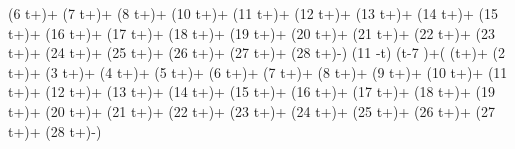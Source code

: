    \left(6 t+\right)+ \sin \left(7 t+\right)+
   \sin \left(8 t+\right)+ \sin \left(10
   t+\right)+ \sin \left(11 t+\right)+ \sin
   \left(12 t+\right)+ \sin \left(13 t+\right)+
   \sin \left(14 t+\right)+ \sin \left(15
   t+\right)+ \sin \left(16 t+\right)+ \sin
   \left(17 t+\right)+ \sin \left(18 t+\right)+
   \sin \left(19 t+\right)+ \sin \left(20
   t+\right)+ \sin \left(21 t+\right)+ \sin
   \left(22 t+\right)+ \sin \left(23 t+\right)+
   \sin \left(24 t+\right)+ \sin \left(25
   t+\right)+ \sin \left(26 t+\right)+ \sin
   \left(27 t+\right)+ \sin \left(28
   t+\right)-\right) \theta (11 \pi -t) \theta (t-7 \pi
   )+\left( \sin \left(t+\right)+ \sin \left(2
   t+\right)+ \sin \left(3 t+\right)+ \sin
   \left(4 t+\right)+ \sin \left(5 t+\right)+ \sin
   \left(6 t+\right)+ \sin \left(7 t+\right)+
   \sin \left(8 t+\right)+ \sin \left(9
   t+\right)+ \sin \left(10 t+\right)+ \sin
   \left(11 t+\right)+ \sin \left(12
   t+\right)+ \sin \left(13 t+\right)+ \sin
   \left(14 t+\right)+ \sin \left(15 t+\right)+
   \sin \left(16 t+\right)+ \sin \left(17
   t+\right)+ \sin \left(18 t+\right)+ \sin
   \left(19 t+\right)+ \sin \left(20 t+\right)+
   \sin \left(21 t+\right)+ \sin \left(22
   t+\right)+ \sin \left(23 t+\right)+ \sin
   \left(24 t+\right)+ \sin \left(25 t+\right)+
   \sin \left(26 t+\right)+ \sin \left(27
   t+\right)+ \sin \left(28 t+\right)-\right)
